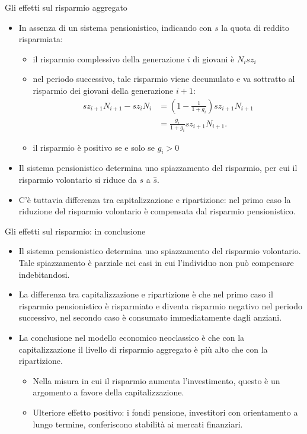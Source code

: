 \documentclass[aspectratio=64,12pt]{beamer}
\begin{document}
\begin{frame}{Gli effetti sul risparmio aggregato}
\begin{itemize}
\item In assenza di un sistema pensionistico, indicando con $s$ la quota di
reddito risparmiata:
\begin{itemize}
\item il risparmio complessivo della generazione $i$ di giovani è $N_isz_i$
\item nel periodo successivo, tale risparmio viene decumulato e va sottratto al
risparmio dei giovani della generazione $i+1$:
\begin{equation*}
\begin{split}
sz_{i+1}N_{i+1}-sz_iN_i&=\left(1-\frac{1}{1+g_i}\right)sz_{i+1}N_{i+1} \\
&= \frac{g_i}{1+g_i}sz_{i+1}N_{i+1}.
\end{split}
\end{equation*}
\item il risparmio è positivo se e solo se $g_i>0$
\end{itemize}
\item Il sistema pensionistico determina uno spiazzamento
  del risparmio, per cui il risparmio volontario si riduce da $s$ a $\hat s$.
\item C'è tuttavia differenza tra capitalizzazione e ripartizione: nel primo
  caso la riduzione del risparmio volontario è compensata dal risparmio
  pensionistico.
\end{itemize}
\end{frame}


\begin{frame}{Gli effetti sul risparmio: in conclusione}
\begin{itemize}
\item Il sistema pensionistico determina uno spiazzamento del risparmio
  volontario. Tale spiazzamento è parziale nei casi in cui l'individuo non può
  compensare indebitandosi.
\item La differenza tra capitalizzazione e ripartizione è che nel primo caso
  il risparmio pensionistico è risparmiato e diventa risparmio negativo nel
  periodo successivo, nel secondo caso è consumato immediatamente dagli
  anziani.
\item La conclusione nel modello economico neoclassico è che con la
  capitalizzazione il livello di risparmio aggregato è più alto che con la
  ripartizione.
\begin{itemize}
\item Nella misura in cui il risparmio aumenta l'investimento, questo è un
  argomento a favore della capitalizzazione.
\item Ulteriore effetto positivo: i fondi pensione, investitori con
  orientamento a lungo termine, conferiscono stabilità ai mercati finanziari.
\end{itemize}
\end{itemize}
\end{frame}
\end{document}
